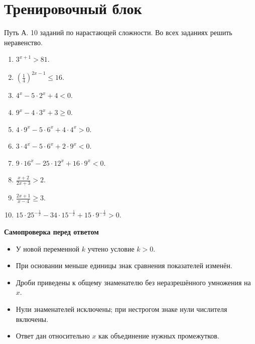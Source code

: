 \documentclass[a4paper,12pt]{article}
\newcommand{\idea}[1]{\textcolor{darkaccent}{\textbf{#1}}}
\newcommand{\sect}[1]{\section*{\color{darkaccent}#1}}
\begin{document}
\sect{Тренировочный блок}
\textcolor{muted}{Путь А. 10 заданий по нарастающей сложности. Во всех заданиях решить неравенство.}
\begin{enumerate}[label=\textbf{\arabic*.},leftmargin=11mm,itemsep=9pt]
\item $3^{x+1}>81.$
\item $\displaystyle\left(\frac14\right)^{2x-1}\le16.$
\item $4^x-5\cdot2^x+4<0.$
\item $9^x-4\cdot3^x+3\ge0.$
\item $4\cdot9^x-5\cdot6^x+4\cdot4^x>0.$
\item $3\cdot4^x-5\cdot6^x+2\cdot9^x<0.$
\item $9\cdot16^x-25\cdot12^x+16\cdot9^x<0.$
\item $\displaystyle\frac{x+2}{2x+3}>2.$
\item $\displaystyle\frac{2x+1}{x-4}\ge3.$
\item $\displaystyle15\cdot25^{-\frac1x}-34\cdot15^{-\frac1x}
 +15\cdot9^{-\frac1x}>0.$
\end{enumerate}
\vspace{7mm}
\idea{Самопроверка перед ответом}
\begin{itemize}[label=\textcolor{accent}{\textbullet},leftmargin=7mm]
\item У новой переменной $k$ учтено условие $k>0$.
\item При основании меньше единицы знак сравнения показателей изменён.
\item Дроби приведены к общему знаменателю без неразрешённого умножения на $x$.
\item Нули знаменателей исключены; при нестрогом знаке нули числителя включены.
\item Ответ дан относительно $x$ как объединение нужных промежутков.
\end{itemize}
\clearpage
\end{document}

